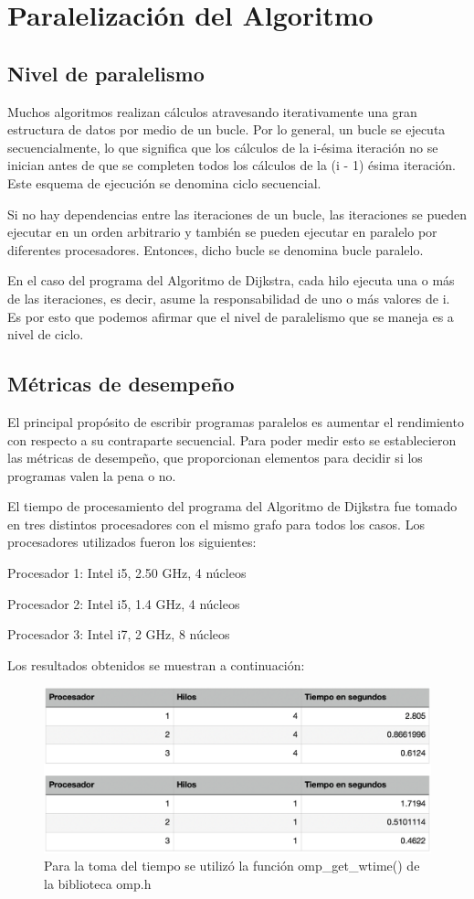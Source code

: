 \documentclass[11pt]{article}
\begin{document}
\section{Paralelización del Algoritmo}
\subsection{Nivel de paralelismo}
Muchos algoritmos realizan cálculos atravesando iterativamente una gran estructura de datos por medio de un bucle. Por lo general, un bucle se ejecuta secuencialmente, lo que significa que los cálculos de la i-ésima iteración no se inician antes de que se completen todos los cálculos de la (i - 1) ésima iteración. Este esquema de ejecución se denomina ciclo secuencial.
\par
Si no hay dependencias entre las iteraciones de un bucle, las iteraciones se pueden ejecutar en un orden arbitrario y también se pueden ejecutar en paralelo por diferentes procesadores. Entonces, dicho bucle se denomina bucle paralelo.
\par 
En el caso del programa del Algoritmo de Dijkstra, cada hilo ejecuta una o más de las iteraciones, es decir, asume la responsabilidad de uno o más valores de i. Es por esto que podemos afirmar que el nivel de paralelismo que se maneja es a nivel de ciclo.

\subsection{Métricas de desempeño}
El principal propósito de escribir programas paralelos es aumentar el rendimiento con respecto a su contraparte secuencial. Para poder medir esto se establecieron las métricas de desempeño, que proporcionan elementos para decidir si los programas valen la pena o no.
\par
El tiempo de procesamiento del programa del Algoritmo de Dijkstra fue tomado en tres distintos procesadores con el mismo grafo para todos los casos. Los procesadores utilizados fueron los siguientes:
\par
Procesador 1: Intel i5, 2.50 GHz, 4 núcleos
\par
Procesador 2: Intel i5, 1.4 GHz, 4 núcleos
\par
Procesador 3: Intel i7, 2 GHz, 8 núcleos
\par
Los resultados obtenidos se muestran a continuación:

\begin{figure}[!htbp]
\centering
\includegraphics[scale = .5]{tiempo}
\caption{Para la toma del tiempo se utilizó la función omp\_get\_wtime() de la biblioteca omp.h}
\end{figure}
\end{document}
